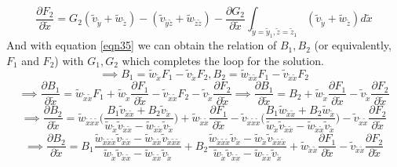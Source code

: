 \documentclass{article}
\begin{document}
\begin{equation} \label{eqn37}
\frac{\partial F_2}{\partial \tilde{x}} = G_2 (\tilde{v}_{\tilde{y}}+\tilde{w}_{\tilde{z}}) - (\tilde{v}_{\tilde{y}\tilde{z}}+\tilde{w}_{\tilde{z}\tilde{z}}) - \frac{\partial G_2}{\partial \tilde{x}} \int_{\tilde{y}=\tilde{y}_1, \tilde{z}=\tilde{z}_1} (\tilde{v}_{\tilde{y}}+\tilde{w}_{\tilde{z}}) d\tilde{x}
\end{equation}
And with equation \ref{eqn35} we can obtain the relation of $B_1, B_2$ (or equivalently, $F_1$ and $F_2$) with $G_1, G_2$ which completes the loop for the solution.
\begin{equation*}
\implies B_1 = \tilde{w}_{\tilde{x}} F_1 - \tilde{v}_{\tilde{x}} F_2, B_2 = \tilde{w}_{\tilde{x}\tilde{x}} F_1 - \tilde{v}_{\tilde{x}\tilde{x}} F_2
\end{equation*}
\begin{equation*}
\implies \frac{\partial B_1}{\partial \tilde{x}} = \tilde{w}_{\tilde{x}\tilde{x}} F_1 + \tilde{w}_{\tilde{x}} \frac{\partial F_1}{\partial \tilde{x}} - \tilde{v}_{\tilde{x}\tilde{x}} F_2 - \tilde{v}_{\tilde{x}} \frac{\partial F_2}{\partial \tilde{x}} \implies \frac{\partial B_1}{\partial \tilde{x}} = B_2 + \tilde{w}_{\tilde{x}} \frac{\partial F_1}{\partial \tilde{x}} - \tilde{v}_{\tilde{x}} \frac{\partial F_2}{\partial \tilde{x}}
\end{equation*}
\begin{equation*}
\implies \frac{\partial B_2}{\partial \tilde{x}} = \tilde{w}_{\tilde{x}\tilde{x}\tilde{x}} \bigg(\frac{B_1 \tilde{v}_{\tilde{x}\tilde{x}} + B_2 \tilde{v}_{\tilde{x}}}{\tilde{w}_{\tilde{x}}\tilde{v}_{\tilde{x}\tilde{x}}-\tilde{w}_{\tilde{x}\tilde{x}}\tilde{v}_{\tilde{x}}}\bigg) + \tilde{w}_{\tilde{x}\tilde{x}} \frac{\partial F_1}{\partial \tilde{x}} - \tilde{v}_{\tilde{x}\tilde{x}\tilde{x}} \bigg(\frac{B_1 \tilde{w}_{\tilde{x}\tilde{x}} + B_2 \tilde{w}_{\tilde{x}}}{\tilde{w}_{\tilde{x}}\tilde{v}_{\tilde{x}\tilde{x}}-\tilde{w}_{\tilde{x}\tilde{x}}\tilde{v}_{\tilde{x}}}\bigg) - \tilde{v}_{\tilde{x}\tilde{x}} \frac{\partial F_2}{\partial \tilde{x}}
\end{equation*}
\begin{equation*}
\implies \frac{\partial B_2}{\partial \tilde{x}} = B_1 \frac{\tilde{w}_{\tilde{x}\tilde{x}\tilde{x}} \tilde{v}_{\tilde{x}\tilde{x}} - \tilde{w}_{\tilde{x}\tilde{x}} \tilde{v}_{\tilde{x}\tilde{x}\tilde{x}}}{\tilde{w}_{\tilde{x}}\tilde{v}_{\tilde{x}\tilde{x}}-\tilde{w}_{\tilde{x}\tilde{x}}\tilde{v}_{\tilde{x}}} + B_2 \frac{\tilde{w}_{\tilde{x}\tilde{x}\tilde{x}} \tilde{v}_{\tilde{x}} - \tilde{w}_{\tilde{x}} \tilde{v}_{\tilde{x}\tilde{x}\tilde{x}}}{\tilde{w}_{\tilde{x}}\tilde{v}_{\tilde{x}\tilde{x}}-\tilde{w}_{\tilde{x}\tilde{x}}\tilde{v}_{\tilde{x}}} + \tilde{w}_{\tilde{x}\tilde{x}} \frac{\partial F_1}{\partial \tilde{x}} - \tilde{v}_{\tilde{x}\tilde{x}} \frac{\partial F_2}{\partial \tilde{x}}
\end{equation*}
\end{document}
